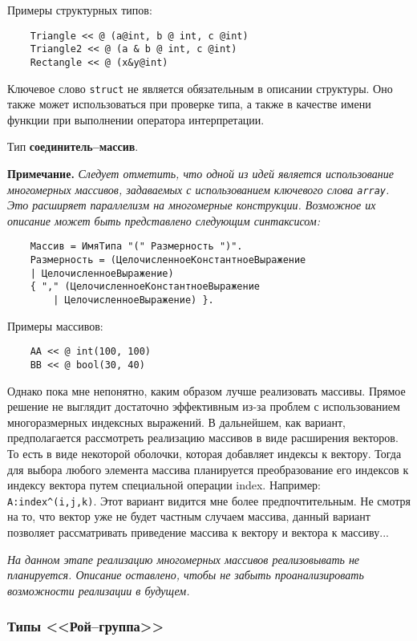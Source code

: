 {Примеры структурных типов:

\begin{verbatim}
    Triangle << @ (a@int, b @ int, c @int)
    Triangle2 << @ (a & b @ int, c @int)
    Rectangle << @ (x&y@int)
\end{verbatim}

Ключевое слово \verb|struct| не является обязательным в описании структуры. Оно также может использоваться при проверке типа, а также в качестве имени функции при выполнении оператора интерпретации.

Тип \textbf{соединитель--массив}.

\textbf{Примечание.}
\textit{Следует отметить, что одной из идей является использование многомерных массивов, задаваемых с использованием ключевого слова \texttt{array}. Это расширяет параллелизм на многомерные конструкции. Возможное их описание может быть представлено следующим синтаксисом:}

\begin{verbatim}
    Массив = ИмяТипа "(" Размерность ")".
    Размерность = (ЦелочисленноеКонстантноеВыражение
    | ЦелочисленноеВыражение)
    { "," (ЦелочисленноеКонстантноеВыражение
        | ЦелочисленноеВыражение) }.
\end{verbatim}


Примеры массивов:

\begin{verbatim}
    AA << @ int(100, 100)
    BB << @ bool(30, 40)
\end{verbatim}

Однако пока мне непонятно, каким образом лучше реализовать массивы. Прямое решение не выглядит достаточно эффективным из-за проблем с использованием многоразмерных индексных выражений. В дальнейшем, как вариант, предполагается рассмотреть реализацию массивов в виде расширения векторов. То есть в виде некоторой оболочки, которая добавляет индексы к вектору. Тогда для выбора любого элемента массива планируется преобразование его индексов к индексу вектора путем специальной операции index. Например: \verb|A:index^(i,j,k)|. Этот вариант видится мне более предпочтительным. Не смотря на то, что вектор уже не будет частным случаем массива, данный вариант позволяет рассматривать приведение массива к вектору и вектора к массиву...

\textit{На данном этапе реализацию многомерных массивов реализовывать не планируется. Описание оставлено, чтобы не забыть проанализировать возможности реализации в будущем.}

\subsubsection{Типы <<Рой--группа>>}

}
